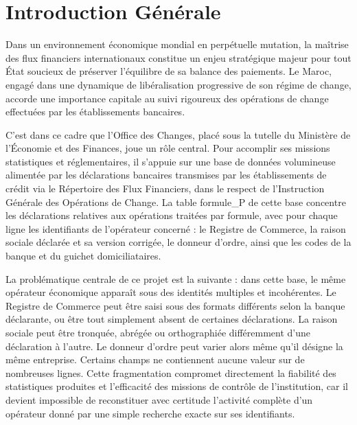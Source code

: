 \clearpage
{}
\setcounter{page}{6}

\chapter*{Introduction Générale}
\label{chapter:introduction}

Dans un environnement économique mondial en perpétuelle mutation, la maîtrise des flux financiers internationaux constitue un enjeu stratégique majeur pour tout État soucieux de préserver l'équilibre de sa balance des paiements. Le Maroc, engagé dans une dynamique de libéralisation progressive de son régime de change, accorde une importance capitale au suivi rigoureux des opérations de change effectuées par les établissements bancaires.

C'est dans ce cadre que l'Office des Changes, placé sous la tutelle du Ministère de l'Économie et des Finances, joue un rôle central. Pour accomplir ses missions statistiques et réglementaires, il s'appuie sur une base de données volumineuse alimentée par les déclarations bancaires transmises par les établissements de crédit via le Répertoire des Flux Financiers, dans le respect de l'Instruction Générale des Opérations de Change. La table formule\_P de cette base concentre les déclarations relatives aux opérations traitées par formule, avec pour chaque ligne les identifiants de l'opérateur concerné : le Registre de Commerce, la raison sociale déclarée et sa version corrigée, le donneur d'ordre, ainsi que les codes de la banque et du guichet domiciliataires.

La problématique centrale de ce projet est la suivante : dans cette base, le même opérateur économique apparaît sous des identités multiples et incohérentes. Le Registre de Commerce peut être saisi sous des formats différents selon la banque déclarante, ou être tout simplement absent de certaines déclarations. La raison sociale peut être tronquée, abrégée ou orthographiée différemment d'une déclaration à l'autre. Le donneur d'ordre peut varier alors même qu'il désigne la même entreprise. Certains champs ne contiennent aucune valeur sur de nombreuses lignes. Cette fragmentation compromet directement la fiabilité des statistiques produites et l'efficacité des missions de contrôle de l'institution, car il devient impossible de reconstituer avec certitude l'activité complète d'un opérateur donné par une simple recherche exacte sur ses identifiants.

